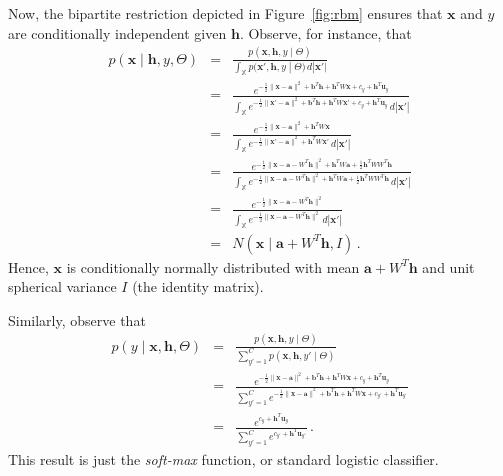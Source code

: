 \documentclass[a4paper]{article}
\renewcommand{\v}[1]{\mathbf{#1}}
\begin{document}
Now, the bipartite restriction depicted in Figure~\ref{fig:rbm} ensures that $\v{x}$ and $y$
are conditionally independent given $\v{h}$.
Observe, for instance, that
\begin{eqnarray}
   p(\v{x}\;|\;\v{h},y,\Theta) & = &
\frac{ p(\v{x},\v{h},y\;|\;\Theta)}
{ \int_{\mathbb{X}}p(\v{x}',\v{h},y\;|\;\Theta)\,d|\v{x}'|}
\nonumber\\&=&
\frac{
    e^{-\frac{1}{2}\|\v{x}-\v{a}\|^2+\v{b}^T\v{h}+\v{h}^T W\v{x}+c_y+\v{h}^T \v{u}_y}
}
{
\int_{\mathbb{X}}
    e^{-\frac{1}{2}\|\v{x}'-\v{a}\|^2+\v{b}^T\v{h}+\v{h}^T W\v{x}'+c_y+\v{h}^T \v{u}_y}
\,d|\v{x}'|
}
\nonumber\\&=&
\frac{
    e^{-\frac{1}{2}\|\v{x}-\v{a}\|^2+\v{h}^T W\v{x}}
}
{
\int_{\mathbb{X}}
    e^{-\frac{1}{2}\|\v{x}'-\v{a}\|^2+\v{h}^T W\v{x}'}
\,d|\v{x}'|
}
\nonumber\\&=&
\frac{
    e^{-\frac{1}{2}\|\v{x}-\v{a}-W^T\v{h}\|^2+\v{h}^T W\v{a}+\frac{1}{2}\v{h}^T WW^T \v{h}}
}
{
    \int_{\mathbb{X}}
    e^{-\frac{1}{2}\|\v{x}-\v{a}-W^T\v{h}\|^2+\v{h}^T W\v{a}+\frac{1}{2}\v{h}^T WW^T \v{h}}
    \,d|\v{x}'|
}
\nonumber\\&=&
\frac{
    e^{-\frac{1}{2}\|\v{x}-\v{a}-W^T\v{h}\|^2}
}
{
    \int_{\mathbb{X}}e^{-\frac{1}{2}\|\v{x}-\v{a}-W^T\v{h}\|^2}\,d|\v{x}'|
}
\nonumber\\&=& N(\v{x}\;|\;\v{a}+W^T\v{h},I)\,.
\end{eqnarray}
Hence, $\v{x}$ is conditionally normally distributed with mean $\v{a}+W^T\v{h}$ and unit spherical 
variance $I$ (the identity matrix).

Similarly, observe that
\begin{eqnarray}
    p(y\;|\;\v{x},\v{h},\Theta) & = & 
\frac{p(\v{x},\v{h},y\;|\;\Theta)}
{\sum_{y'=1}^{C}p(\v{x},\v{h},y'\;|\;\Theta)}
\nonumber\\&=&
\frac{
    e^{-\frac{1}{2}\|\v{x}-\v{a}\|^2+\v{b}^T\v{h}+\v{h}^T W\v{x}+c_y+\v{h}^T\v{u}_y}
}
{
   \sum_{y'=1}^{C}
    e^{-\frac{1}{2}\|\v{x}-\v{a}\|^2+\v{b}^T\v{h}+\v{h}^T W\v{x}+c_{y'}+\v{h}^T\v{u}_{y'}}
}
\nonumber\\&=&
\frac{e^{c_y+\v{h}^T\v{u}_y}}
  {\sum_{y'=1}^{C}e^{c_{y'}+\v{h}^T \v{u}_{y'}}}\,.
\end{eqnarray}
This result is just the {\em soft-max} function, or standard logistic classifier.
\end{document}
